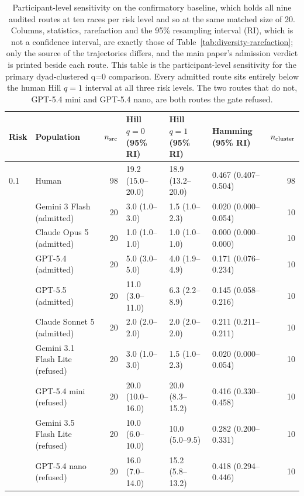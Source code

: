 \documentclass[sigconf,anonymous]{aamas}
\begin{document}
\begin{table}[t]
    \caption{Participant-level sensitivity on the confirmatory baseline, which holds all
    nine audited routes at ten races per risk level and so at the same matched
    size of 20. Columns, statistics, rarefaction and the 95\% resampling
    interval (RI), which is not a confidence interval, are exactly those
    of Table~\ref{tab:diversity-rarefaction}; only the source of the
    trajectories differs, and the main paper's admission verdict is printed
    beside each route. This table is the participant-level sensitivity for the
    primary dyad-clustered q{=}0 comparison. Every admitted route sits entirely
    below the human Hill $q{=}1$ interval at all three risk levels. The two
    routes that do not, GPT-5.4 mini and GPT-5.4 nano, are both routes the gate
    refused.}
    \label{tab:diversity-confirmatory}
    \centering
    \footnotesize
    \setlength{\tabcolsep}{5pt}
    \begin{tabular}{@{}llrlllr@{}}
        \toprule
        Risk & Population & $n_{\rm src}$ & Hill $q{=}0$ (95\% RI)
        & Hill $q{=}1$ (95\% RI) & Hamming (95\% RI) & $n_{\rm cluster}$ \\
        \midrule
        0.1 & Human & 98 & 19.2 (15.0--20.0) & 18.9 (13.2--20.0) & 0.467 (0.407--0.504) & 98 \\
         & Gemini 3 Flash (admitted) & 20 & 3.0 (1.0--3.0) & 1.5 (1.0--2.3) & 0.020 (0.000--0.054) & 10 \\
         & Claude Opus 5 (admitted) & 20 & 1.0 (1.0--1.0) & 1.0 (1.0--1.0) & 0.000 (0.000--0.000) & 10 \\
         & GPT-5.4 (admitted) & 20 & 5.0 (3.0--5.0) & 4.0 (1.9--4.9) & 0.171 (0.076--0.234) & 10 \\
         & GPT-5.5 (admitted) & 20 & 11.0 (3.0--11.0) & 6.3 (2.2--8.9) & 0.145 (0.058--0.216) & 10 \\
         & Claude Sonnet 5 (admitted) & 20 & 2.0 (2.0--2.0) & 2.0 (2.0--2.0) & 0.211 (0.211--0.211) & 10 \\
         & Gemini 3.1 Flash Lite (refused) & 20 & 3.0 (1.0--3.0) & 1.5 (1.0--2.3) & 0.020 (0.000--0.054) & 10 \\
         & GPT-5.4 mini (refused) & 20 & 20.0 (10.0--16.0) & 20.0 (8.3--15.2) & 0.416 (0.330--0.458) & 10 \\
         & Gemini 3.5 Flash Lite (refused) & 20 & 10.0 (6.0--10.0) & 10.0 (5.0--9.5) & 0.282 (0.200--0.331) & 10 \\
         & GPT-5.4 nano (refused) & 20 & 16.0 (7.0--14.0) & 15.2 (5.8--13.2) & 0.418 (0.294--0.446) & 10 \\

\end{tabular}
\end{table}
\end{document}
